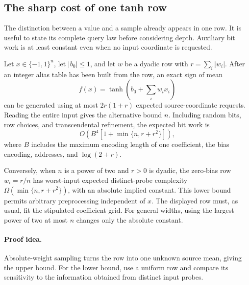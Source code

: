 \subsection{The sharp cost of one tanh row}
\label{sec:new-single-row-law}

The distinction between a value and a sample already appears in one
row. It is useful to state its complete query law before considering
depth. Auxiliary bit work is at least constant even when no input
coordinate is requested.

\begin{theorem}
\label{thm:new-single-row-law}
Let $x\in\{-1,1\}^n$, let $|b_0|\le1$, and let $w$ be a dyadic
row with $r=\sum_i|w_i|$. After an integer alias table has been built
from the row, an exact sign of mean
\[
 f(x)=\tanh\!\left(b_0+\sum_iw_ix_i\right)
\]
can be generated using at most $2r(1+r)$ expected source-coordinate
requests. Reading the entire input gives the alternative bound $n$.
Including random bits, row choices, and transcendental refinement,
the expected bit work is
\[
 O\!\left(B^4[1+\min\{n,r+r^2\}]\right),
\]
where $B$ includes the maximum encoding length of one coefficient,
the bias encoding, addresses, and $\log(2+r)$.

Conversely, when $n$ is a power of two and $r>0$ is dyadic, the
zero-bias row $w_i=r/n$ has worst-input expected distinct-probe
complexity $\Omega(\min\{n,r+r^2\})$, with an absolute implied
constant.
This lower bound permits arbitrary preprocessing independent of $x$.
The displayed row must, as usual, fit the stipulated coefficient grid.
For general widths, using the largest power of two at most $n$ changes
only the absolute constant.
\end{theorem}
\paragraph{Proof idea.}
Absolute-weight sampling turns the row into one unknown source mean, giving
the upper bound. For the lower bound, use a uniform row and compare its
sensitivity to the information obtained from distinct input probes.

